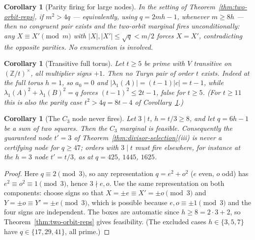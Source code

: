 \documentclass[11pt]{article}
\theoremstyle{plain}
\newtheorem{corollary}[theorem]{Corollary}
\theoremstyle{definition}
\theoremstyle{remark}
\newcommand{\Z}{\mathbb Z}
\begin{document}
\begin{corollary}[Parity firing for large nodes]\label{cor:two-orbit-parity}
In the setting of Theorem~\ref{thm:two-orbit-reps}, if $m^2>4q$ ---
equivalently, using $q=2mh-1$, whenever $m\ge8h$ --- then no congruent pair
exists and the two-orbit marginal fires unconditionally: any
$X\equiv X'\pmod m$ with $|X|,|X'|\le\sqrt q<m/2$ forces $X=X'$,
contradicting the opposite parities.  No enumeration is involved.
\end{corollary}

\begin{corollary}[Transitive full torus]\label{cor:transitive-full-torus}
Let $t\ge5$ be prime with $V$ transitive on $(\Z/t)^\times$, all multiplier
signs $+1$.  Then no Turyn pair of order $t$ exists.  Indeed at the full
torus $h=1$, so $a_0=0$ and $|\lambda_1(A)|=(t-1)|c|=t-1$, while
$\lambda_1(A)^2+\lambda_1(B)^2=q$ forces $(t-1)^2\le2t-1$, false for
$t\ge5$.  (For $t\ge11$ this is also the parity case $t^2>4q=8t-4$ of
Corollary~\ref{cor:two-orbit-parity}.)
\end{corollary}

\begin{corollary}[The $C_3$ node never fires]\label{cor:c3-feasible}
Let $3\mid t$, $h=t/3\ge8$, and let $q=6h-1$ be a sum of two squares.  Then
the $C_3$ marginal is feasible.  Consequently the guaranteed node $t'=3$ of
Theorem~\ref{thm:divisor-selection}(iii) is never a certifying node for
$q\ge47$; orders with $3\mid t$ must fire elsewhere, for instance at the
$h=3$ node $t'=t/3$, as at $q=425$, $1445$, $1625$.
\end{corollary}

\begin{proof}
Here $q\equiv2\pmod3$, so any representation $q=e^2+o^2$ ($e$ even, $o$
odd) has $e^2\equiv o^2\equiv1\pmod3$, hence $3\nmid e,o$.  Use the same
representation on both components: choose signs so that
$X=\pm e\equiv X'=\pm o\pmod 3$ and $Y=\pm o\equiv Y'=\pm e\pmod 3$, which
is possible because $e,o\equiv\pm1\pmod3$ and the four signs are
independent.  The boxes are automatic since $h\ge8=2\cdot3+2$, so
Theorem~\ref{thm:two-orbit-reps} gives feasibility.  (The excluded cases
$h\in\{3,5,7\}$ have $q\in\{17,29,41\}$, all prime.)
\end{proof}
\end{document}
